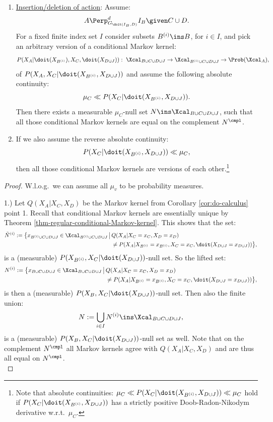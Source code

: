\begin{Cor}
\begin{enumerate}
\item \underline{Insertion/deletion of action}: Assume:
            \[ A \Perp^d_{G_{\doit(I_B,D)}} I_B \given C  \cup D.  \]
            For a fixed finite index set $I$ consider subsets $B^{(i)} \ins B$, for $i \in I$, and  pick an arbitrary version of a conditional Markov kernel:
            \[ P(X_A|\doit(X_{B^{(i)}}),X_C,\doit(X_{D\cup J})):\; \Xcal_{B \cup C \cup D \cup J} \to \Xcal_{B^{(i)} \cup C \cup D \cup J} \to \Prob(\Xcal_A), \]
            of $P(X_A,X_C|\doit(X_{B^{(i)}},X_{D\cup J}))$ and assume the following absolute continuity:
            \[ \mu_C \ll  P(X_C|\doit(X_{B^{(i)}},X_{D\cup J})). \]
            Then there exists a measurable $\mu_C$-null set
        $N \ins \Xcal_{B \cup C \cup D \cup J}$,
        such that all those conditional Markov kernels are equal on the complement $N^\cmpl$.
    \item[] If we also assume the reverse absolute continuity:
        \[ P(X_C|\doit(X_{B^{(i)}},X_{D\cup J})) \ll \mu_C, \]
        then all those conditional Markov kernels are versions of each other.\footnote{Note that absolute continuities: $\mu_C \ll P(X_C|\doit(X_{B^{(i)}},X_{D\cup J})) \ll \mu_C$ hold if $P(X_C|\doit(X_{B^{(i)}},X_{D\cup J}))$ has a strictly positive Doob-Radon-Nikodym derivative w.r.t.\ $\mu_C$.}
\end{enumerate}
\begin{proof}
 W.l.o.g.\ we can assume all $\mu_v$ to be probability measures.

 1.) Let $Q(X_A|X_C,X_D)$ be the Markov kernel from Corollary \ref{cor:do-calculus} point 1.
Recall that conditional Markov kernels are essentially unique by Theorem \ref{thm-regular-conditional-Markov-kernel}. 
    This shows that the set:
\begin{align*}
    \tilde N^{(i)} := \bigl\{ x_{B^{(i)} \cup C \cup D \cup J} \in \Xcal_{B^{(i)} \cup C \cup D \cup J} \,\big|\,
       & Q(X_A|X_C=x_C,X_D=x_D)\\ 
       &\neq P(X_A|X_{B^{(i)}}=x_{B^{(i)}},X_C=x_C,\doit(X_{D\cup J}=x_{D \cup J})) \bigr\},
\end{align*}
is a (measurable) $P(X_{B^{(i)}},X_C|\doit(X_{D\cup J}))$-null set. So the lifted set:
\begin{align*}
    N^{(i)} := \bigl\{ x_{B \cup C \cup D \cup J} \in \Xcal_{B \cup C \cup D \cup J} \,\big|\,
       & Q(X_A|X_C=x_C,X_D=x_D)\\ 
       &\neq P(X_A|X_{B^{(i)}}=x_{B^{(i)}},X_C=x_C,\doit(X_{D\cup J}=x_{D \cup J})) \bigr\},
\end{align*}
is then a (measurable) $P(X_B,X_C|\doit(X_{D\cup J}))$-null set. Then also the finite union:
 \[ N := \bigcup_{i \in I} N^{(i)}  \ins \Xcal_{B \cup C \cup D \cup J},  \]
 is a (measurable) $P(X_B,X_C|\doit(X_{D\cup J}))$-null set as well. 
 Note that on the complement $N^\cmpl$ all Markov kernels agree with $Q(X_A|X_C,X_D)$ and are thus all equal on $N^\cmpl$.\\


\end{proof}
\end{Cor}
